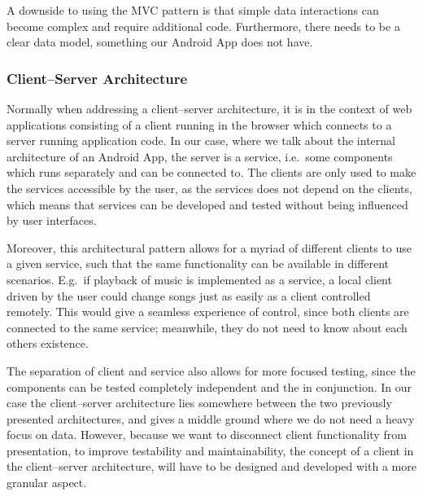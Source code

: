 A downside to using the MVC pattern is that simple data interactions can become complex and require additional code.
Furthermore, there needs to be a clear data model, something our Android App does not have.

\subsubsection{Client--Server Architecture}
Normally when addressing a client--server architecture, it is in the context of web applications consisting of a client running in the browser which connects to a server running application code.
In our case, where we talk about the internal architecture of an Android App, the server is a service, i.e.~some components which runs separately and can be connected to.
The clients are only used to make the services accessible by the user, as the services does not depend on the clients, which means that services can be developed and tested without being influenced by user interfaces.

Moreover, this architectural pattern allows for a myriad of different clients to use a given service, such that the same functionality can be available in different scenarios.
E.g.~if playback of music is implemented as a service, a local client driven by the user could change songs just as easily as a client controlled remotely.
This would give a seamless experience of control, since both clients are connected to the same service; meanwhile, they do not need to know about each others existence.

The separation of client and service also allows for more focused testing, since the components can be tested completely independent and the in conjunction.
In our case the client--server architecture lies somewhere between the two previously presented architectures, and gives a middle ground where we do not need a heavy focus on data.
However, because we want to disconnect client functionality from presentation, to improve testability and maintainability, the concept of a client in the client--server architecture, will have to be designed and developed with a more granular aspect.

